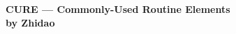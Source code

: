 \begin{flushright}
\LARGE
{\bf
CURE --- Commonly-Used Routine Elements
}
\\
\large
{\bf
by Zhidao
}
\end{flushright}
